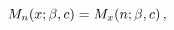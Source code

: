 $\mathop{M_{n}\/}\nolimits\!\left(x;\beta,c\right)=\mathop{M_{x}\/}\nolimits\!%
\left(n;\beta,c\right),$